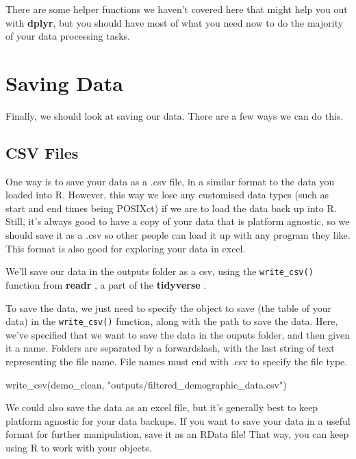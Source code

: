 \documentclass[
]{book}
\newenvironment{Shaded}{\begin{snugshade}}{\end{snugshade}}
\newcommand{\FunctionTok}[1]{\textcolor[rgb]{0.00,0.00,0.00}{#1}}
\newcommand{\NormalTok}[1]{#1}
\newcommand{\StringTok}[1]{\textcolor[rgb]{0.31,0.60,0.02}{#1}}
\begin{document}
There are some helper functions we haven't covered here that might help you out with \textbf{dplyr}, but you should have most of what you need now to do the majority of your data processing tasks.

\hypertarget{saving-data}{%
\section{Saving Data}\label{saving-data}}

Finally, we should look at saving our data. There are a few ways we can do this.

\hypertarget{csv-files}{%
\subsection{CSV Files}\label{csv-files}}

One way is to save your data as a .csv file, in a similar format to the data you loaded into R. However, this way we lose any customised data types (such as start and end times being POSIXct) if we are to load the data back up into R. Still, it's always good to have a copy of your data that is platform agnostic, so we should save it as a .csv so other people can load it up with any program they like. This format is also good for exploring your data in excel.

We'll save our data in the outputs folder as a csv, using the \texttt{write\_csv()} function from \textbf{readr} \citep{R-readr}, a part of the \textbf{tidyverse} \citep{R-tidyverse}.

To save the data, we just need to specify the object to save (the table of your data) in the \texttt{write\_csv()} function, along with the path to save the data. Here, we've specified that we want to save the data in the ouputs folder, and then given it a name. Folders are separated by a forwardslash, with the last string of text representing the file name. File names must end with .csv to specify the file type.

\begin{Shaded}
\begin{Highlighting}[]
\FunctionTok{write\_csv}\NormalTok{(demo\_clean, }\StringTok{"outputs/filtered\_demographic\_data.csv"}\NormalTok{)}
\end{Highlighting}
\end{Shaded}

We could also save the data as an excel file, but it's generally best to keep platform agnostic for your data backups. If you want to save your data in a useful format for further manipulation, save it as an RData file! That way, you can keep using R to work with your objects.
\end{document}
